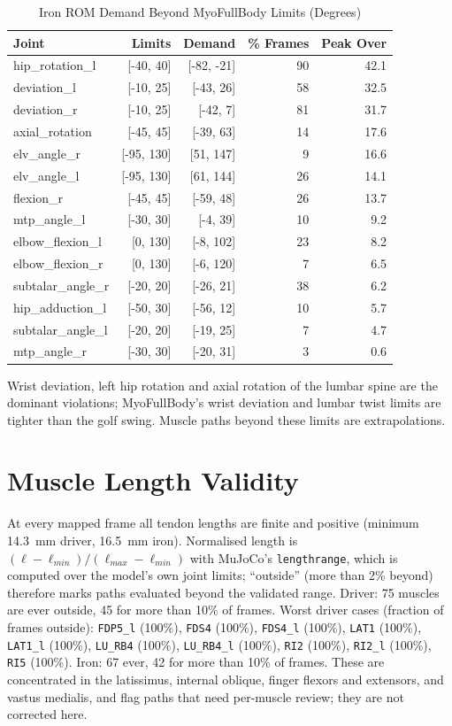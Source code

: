 \documentclass[11pt,a4paper]{article}
\begin{document}
\begin{table}[h]\centering\small
\caption{Iron ROM Demand Beyond MyoFullBody Limits (Degrees)}
\begin{tabular}{lrrrr}\toprule Joint & Limits & Demand & \% Frames & Peak Over \\\midrule
hip\_rotation\_l & [-40, 40] & [-82, -21] & 90 & 42.1 \\
deviation\_l & [-10, 25] & [-43, 26] & 58 & 32.5 \\
deviation\_r & [-10, 25] & [-42, 7] & 81 & 31.7 \\
axial\_rotation & [-45, 45] & [-39, 63] & 14 & 17.6 \\
elv\_angle\_r & [-95, 130] & [51, 147] & 9 & 16.6 \\
elv\_angle\_l & [-95, 130] & [61, 144] & 26 & 14.1 \\
flexion\_r & [-45, 45] & [-59, 48] & 26 & 13.7 \\
mtp\_angle\_l & [-30, 30] & [-4, 39] & 10 & 9.2 \\
elbow\_flexion\_l & [0, 130] & [-8, 102] & 23 & 8.2 \\
elbow\_flexion\_r & [0, 130] & [-6, 120] & 7 & 6.5 \\
subtalar\_angle\_r & [-20, 20] & [-26, 21] & 38 & 6.2 \\
hip\_adduction\_l & [-50, 30] & [-56, 12] & 10 & 5.7 \\
subtalar\_angle\_l & [-20, 20] & [-19, 25] & 7 & 4.7 \\
mtp\_angle\_r & [-30, 30] & [-20, 31] & 3 & 0.6 \\
\bottomrule\end{tabular}\end{table}
\noindent Wrist deviation, left hip rotation and axial rotation of the lumbar spine are the dominant violations; MyoFullBody's wrist deviation and lumbar twist limits are tighter than the golf swing. Muscle paths beyond these limits are extrapolations.

\section{Muscle Length Validity}
At every mapped frame all tendon lengths are finite and positive (minimum 14.3~mm driver, 16.5~mm iron). Normalised length is $(\ell-\ell_{min})/(\ell_{max}-\ell_{min})$ with MuJoCo's \texttt{lengthrange}, which is computed over the model's own joint limits; ``outside'' (more than 2\% beyond) therefore marks paths evaluated beyond the validated range. Driver: 75 muscles are ever outside, 45 for more than 10\% of frames. Worst driver cases (fraction of frames outside): \texttt{FDP5\_l} (100\%), \texttt{FDS4} (100\%), \texttt{FDS4\_l} (100\%), \texttt{LAT1} (100\%), \texttt{LAT1\_l} (100\%), \texttt{LU\_RB4} (100\%), \texttt{LU\_RB4\_l} (100\%), \texttt{RI2} (100\%), \texttt{RI2\_l} (100\%), \texttt{RI5} (100\%). Iron: 67 ever, 42 for more than 10\% of frames. These are concentrated in the latissimus, internal oblique, finger flexors and extensors, and vastus medialis, and flag paths that need per-muscle review; they are not corrected here.
\end{document}
